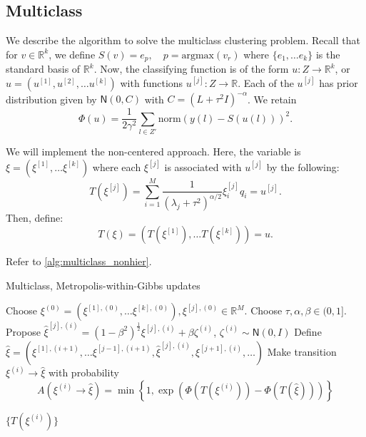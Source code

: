 \documentclass{siamart1116}
\begin{document}
    \subsection{Multiclass} \label{sec:algorithms_multiclass}
        We describe the algorithm to solve the multiclass clustering problem. Recall that for $v \in \mathbb{R}^k$, we define $S(v) = e_p, \quad p = \text{argmax} (v_r)$ where $\{e_1, \ldots e_k\}$ is the standard basis of $\mathbb{R}^k$. Now, the classifying function is of the form $u: Z \to \mathbb{R}^k$, or $u = (u^{[1]}, u^{[2]}, \ldots u^{[k]})$ with functions $u^{[j]}: Z \to \mathbb{R}$. Each of the $u^{[j]}$ has prior distribution given by $\mathsf{N}(0, C)$ with $C = (L + \tau^2 I)^{-\alpha}$. We retain
        \[ \Phi(u) = \frac{1}{2\gamma^2}\sum_{l \in Z'} \text{norm}(y(l) - S(u(l)))^2. \]

        We will implement the non-centered approach. Here, the variable is $\xi = (\xi^{[1]}, \ldots \xi^{[k]})$ where each $\xi^{[j]}$ is associated with $u^{[j]}$ by the following:
        \[T(\xi^{[j]}) = \sum_{i=1}^M \frac{1}{(\lambda_j + \tau^2)^{\alpha/2}} \xi^{[j]}_i q_i = u^{[j]}.\]
        Then, define:
        \begin{equation}
        \label{eqn:multiclass_T}
        T(\xi) = (T(\xi^{[1]}), \ldots T(\xi^{[k]}) ) = u.
        \end{equation}

        Refer to \cref{alg:multiclass_nonhier}.
        
        \begin{algorithm}

        \caption{Multiclass, Metropolis-within-Gibbs updates}
        \label{alg:multiclass_nonhier}
        \begin{algorithmic}[1]
        \State Choose $\xi^{(0)} = (\xi^{[1],(0)}, \ldots \xi^{[k],(0)}), \xi^{[j],(0)} \in \mathbb{R}^M$. Choose $\tau, \alpha, \beta \in (0, 1]$. 
                \State Propose $\hat\xi^{[j],(i)} = (1-\beta^2)^{\frac{1}{2}}\xi^{[j],(i)} + \beta \zeta^{(i)}$, $\zeta^{(i)} \sim \mathsf{N}(0, I)$
                \State Define $\hat \xi = (\xi^{[1],(i+1)}, \ldots \xi^{[j-1],(i+1)}, \hat\xi^{[j],(i)}, \xi^{[j+1],(i)}, \ldots)$
                \State Make transition $\xi^{(i)} \to \hat\xi$ with probability
                \[ A(\xi^{(i)} \to \hat\xi) = \min\left\{1, \exp\left(\Phi(T(\xi^{(i)})) - \Phi(T(\hat \xi))\right) \right\}\]

            \EndFor
        \EndFor

        \State \Return $\{T(\xi^{(i)})\}$
        
        \end{algorithmic}
        \end{algorithm}
\end{document}
